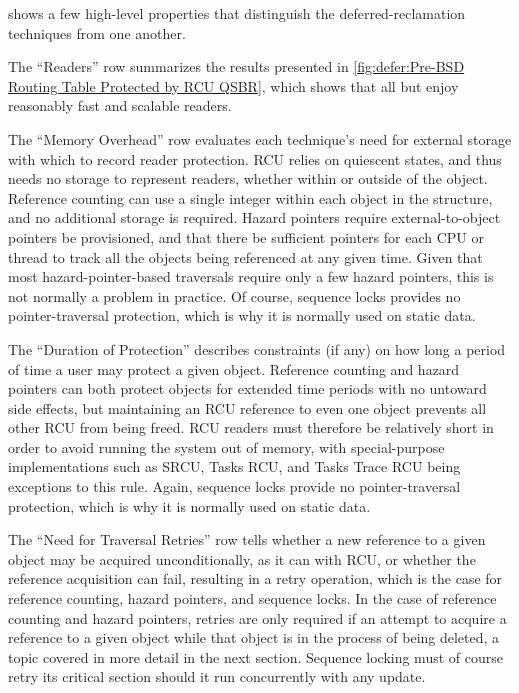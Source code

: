 shows a few high-level properties that distinguish the deferred-reclamation
techniques from one another.

The ``Readers'' row summarizes the results presented in
\cref{fig:defer:Pre-BSD Routing Table Protected by RCU QSBR},
which shows that all but 
enjoy reasonably fast and scalable readers.

The ``Memory Overhead'' row evaluates each technique's need
for external storage with which to record reader protection.
RCU relies on quiescent states, and thus needs no storage to represent
readers, whether within or outside of the object.
Reference counting can use a single integer within each object in the
structure, and no additional storage is required.
Hazard pointers require external-to-object pointers be provisioned,
and that there be sufficient pointers for each CPU or thread to
track all the objects being referenced at any given time.
Given that most hazard-pointer-based traversals require only a few
hazard pointers, this is not normally a problem in practice.
Of course, sequence locks provides no pointer-traversal protection,
which is why it is normally used on static data.

\QuickQuizEnd

The ``Duration of Protection'' describes constraints (if any) on how
long a period of time a user may protect a given object.
Reference counting and hazard pointers can both protect objects for
extended time periods with no untoward side effects, but
maintaining an RCU reference to even one object prevents all other RCU
from being freed.
RCU readers must therefore be relatively short in order to avoid running
the system out of memory, with special-purpose implementations such
as SRCU, Tasks RCU, and Tasks Trace RCU being exceptions to this rule.
Again, sequence locks provide no pointer-traversal protection,
which is why it is normally used on static data.

The ``Need for Traversal Retries'' row tells whether a new reference to
a given object may be acquired unconditionally, as it can with RCU, or
whether the reference acquisition can fail, resulting in a retry
operation, which is the case for reference counting, hazard pointers,
and sequence locks.
In the case of reference counting and hazard pointers, retries are only
required if an attempt to acquire a reference to a given object while
that object is in the process of being deleted, a topic covered in more
detail in the next section.
Sequence locking must of course retry its critical section should it
run concurrently with any update.

